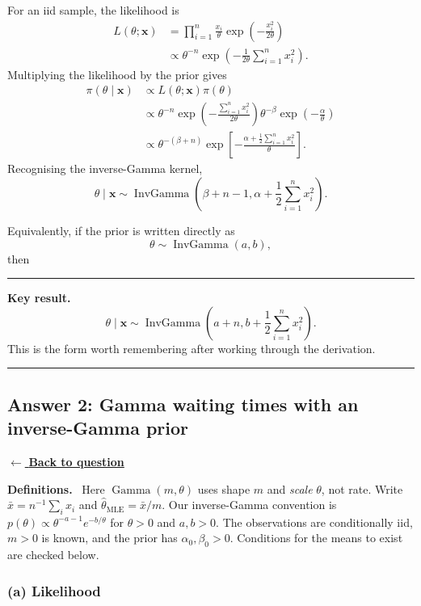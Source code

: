 \documentclass[11pt,a4paper]{article}
\newcommand{\given}{\mathrel{|}}
\newcommand{\xvec}{\boldsymbol{x}}
\DeclareMathOperator{\InvGamma}{InvGamma}
\newcommand{\answernav}[1]{%
  \label{answer:#1}%
  \noindent\hyperref[question:#1]{$\leftarrow$ \textbf{Back to question}}%
  \par\smallskip}
\newcommand{\studyheading}[1]{%
  \par\medskip\noindent\textcolor{statblue}{\textbf{#1.}}\ }
\newenvironment{keyresult}
  {\begin{center}\begin{minipage}{0.92\linewidth}\color{statblue}%
   \hrule\vspace{6pt}\textbf{Key result.}\ }
  {\vspace{6pt}\hrule\end{minipage}\end{center}}
\begin{document}
For an iid sample, the likelihood is
\begin{align*}
  L(\theta;\xvec)
  &=\prod_{i=1}^n
    \frac{x_i}{\theta}
    \exp\left(-\frac{x_i^2}{2\theta}\right)\\
  &\propto
    \theta^{-n}
    \exp\left(-\frac{1}{2\theta}\sum_{i=1}^n x_i^2\right).
\end{align*}
Multiplying the likelihood by the prior gives
\begin{align*}
  \pi(\theta\given\xvec)
  &\propto L(\theta;\xvec)\pi(\theta)\\
  &\propto
    \theta^{-n}
    \exp\left(-\frac{\sum_{i=1}^n x_i^2}{2\theta}\right)
    \theta^{-\beta}
    \exp\left(-\frac{\alpha}{\theta}\right)\\
  &\propto
    \theta^{-(\beta+n)}
    \exp\left[
      -\frac{\alpha+\frac12\sum_{i=1}^n x_i^2}{\theta}
    \right].
\end{align*}
Recognising the inverse-Gamma kernel,
\[
  \boxed{
    \theta\given\xvec
    \sim
    \InvGamma\left(
      \beta+n-1,
      \alpha+\frac12\sum_{i=1}^n x_i^2
    \right)
  }.
\]

Equivalently, if the prior is written directly as
\[
  \theta\sim\InvGamma(a,b),
\]
then
\begin{keyresult}
\[
  \boxed{
    \theta\given\xvec
    \sim
    \InvGamma\left(
      a+n,
      b+\frac12\sum_{i=1}^n x_i^2
    \right)
  }.
\]
This is the form worth remembering after working through the derivation.
\end{keyresult}

\clearpage

\subsection{Answer 2: Gamma waiting times with an inverse-Gamma prior}
\answernav{2}

\studyheading{Definitions}
Here $\operatorname{Gamma}(m,\theta)$ uses shape $m$ and \emph{scale} $\theta$, not rate. Write $\bar x=n^{-1}\sum_i x_i$ and $\widehat\theta_{\mathrm{MLE}}=\bar x/m$. Our inverse-Gamma convention is
$p(\theta)\propto\theta^{-a-1}e^{-b/\theta}$ for $\theta>0$ and $a,b>0$.
The observations are conditionally iid, $m>0$ is known, and the prior has $\alpha_0,\beta_0>0$. Conditions for the means to exist are checked below.

\subsubsection*{(a) Likelihood}
\end{document}
